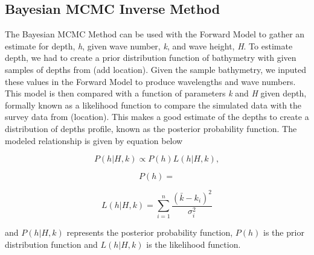 \subsection{Bayesian MCMC Inverse Method}

The Bayesian MCMC Method can be used with the Forward Model to gather an estimate for depth, \textit{h}, given wave number, \textit{k}, and wave height, \textit{H}. To estimate depth, we had to create a prior distribution function of bathymetry with given samples of depths from (add location).  Given the sample bathymetry, we inputed these values in the Forward Model to produce wavelengths and wave numbers. This model is then compared with a function of parameters \textit{k} and \textit{H} given depth, formally known as a likelihood function to compare the simulated data with the survey data from (location). This makes a good estimate of the depths to create a distribution of depths profile, known as the posterior probability function.  The modeled relationship is given by equation below


$$P(h|H,k) \propto P(h)L(h|H,k),$$ 

$$P(h)=$$

\[ L(h|H,k)=\sum\limits_{i=1}^n \frac{(\bar{k}-k_{i})^2}{\sigma_{i}^2}\]


and $P(h|H,k)$ represents the posterior probability function, $P(h)$ is the prior distribution function and $L(h|H,k)$ is the likelihood function.







